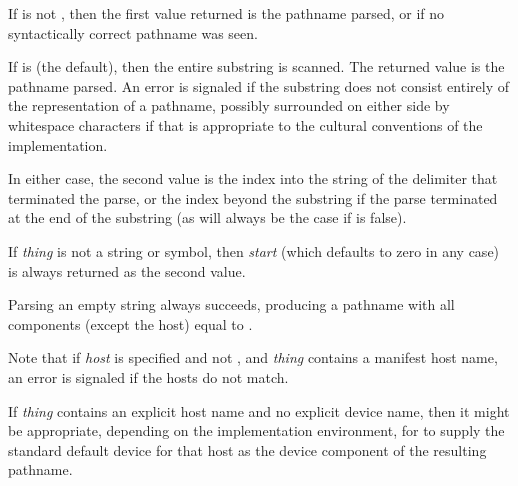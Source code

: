 \begin{defun}[Function]
If  is not {\false}, then the first value
returned is the pathname parsed, or {\false} if no syntactically correct
pathname was seen.

If  is {\false} (the default),
then the entire substring is scanned.
The returned value is the pathname parsed.
An error is signaled if the substring does not consist entirely of
the representation of a pathname, possibly surrounded on either side by
whitespace characters if that is appropriate to the cultural conventions
of the implementation.

In either case, the second value is the index into the string of the delimiter
that terminated the parse, or the index beyond the substring if the
parse terminated at the end of the substring (as will always be the case if
 is false).

If \emph{thing} is not a string or symbol, then \emph{start} (which defaults
to zero in any case) is always returned as the second value.

Parsing an empty string always succeeds, producing a pathname with
all components (except the host) equal to {\nil}.

Note that if \emph{host} is specified and not {\nil},
and \emph{thing} contains a manifest host name, an
error is signaled if the hosts do not match.

If \emph{thing} contains an explicit host name and no explicit device name,
then it might be appropriate, depending on the
implementation environment, for  to supply the
standard default device for that host as the device component
of the resulting pathname.
\end{defun}

\newpage

